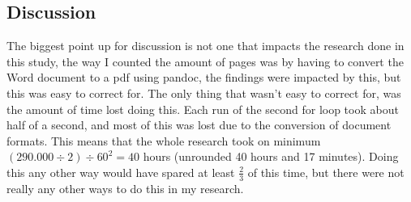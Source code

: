 \documentclass[9pt, a4paper]{article}
\begin{document}
\subsection{Discussion}
\label{sec:discussion}
The biggest point up for discussion is not one that impacts the research done in this study, the way I counted the amount of pages was by having to convert the Word document to a pdf using pandoc, the findings were impacted by this, but this was easy to correct for. The only thing that wasn't easy to correct for, was the amount of time lost doing this. Each run of the second for loop took about half of a second, and most of this was lost due to the conversion of document formats. This means that the whole research took on minimum $(290.000\div2)\div60^2=40$ hours (unrounded 40 hours and 17 minutes). Doing this any other way would have spared at least $\frac{2}{3}$ of this time, but there were not really any other ways to do this in my research.
\end{document}
